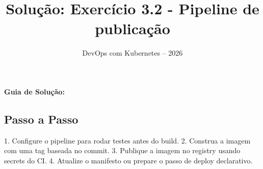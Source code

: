 \documentclass[11pt,a4paper]{article}
\title{\color{secondary}\Huge\textbf{Solução: Exercício 3.2 - Pipeline de publicação}}
\author{\color{primary}DevOps com Kubernetes -- 2026}
\date{}
\begin{document}
\maketitle


\textbf{Guia de Solução:}

\subsection*{\color{secondary}Passo a Passo}

1. Configure o pipeline para rodar testes antes do build.
2. Construa a imagem com uma tag baseada no commit.
3. Publique a imagem no registry usando secrets do CI.
4. Atualize o manifesto ou prepare o passo de deploy declarativo.
\end{document}
